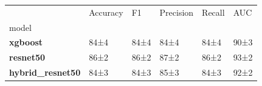 \begin{tabular}{llllll}
\toprule
 & Accuracy & F1 & Precision & Recall & AUC \\
model &  &  &  &  &  \\
\midrule
\textbf{xgboost} & 84±4 & 84±4 & 84±4 & 84±4 & 90±3 \\
\textbf{resnet50} & 86±2 & 86±2 & 87±2 & 86±2 & 93±2 \\
\textbf{hybrid_resnet50} & 84±3 & 84±3 & 85±3 & 84±3 & 92±2 \\
\bottomrule
\end{tabular}
